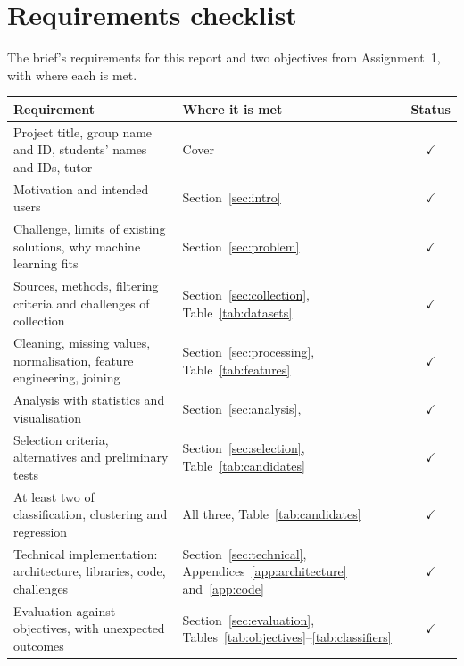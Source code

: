 \clearpage
\section{Requirements checklist}
\label{app:checklist}

The brief's requirements for this report and two objectives from Assignment~1, with where each is met.

{\footnotesize
\begin{longtable}{|L{7.4cm}|L{6.2cm}|c|}
\hline
{}\textbf{Requirement} & \textbf{Where it is met} & \textbf{Status} \\ \hline
\endhead
Project title, group name and ID, students' names and IDs, tutor & Cover & $\checkmark$ \\ \hline
Motivation and intended users & Section~\ref{sec:intro} & $\checkmark$ \\ \hline
Challenge, limits of existing solutions, why machine learning fits & Section~\ref{sec:problem} & $\checkmark$ \\ \hline
Sources, methods, filtering criteria and challenges of collection & Section~\ref{sec:collection}, Table~\ref{tab:datasets} & $\checkmark$ \\ \hline
Cleaning, missing values, normalisation, feature engineering, joining & Section~\ref{sec:processing}, Table~\ref{tab:features} & $\checkmark$ \\ \hline
Analysis with statistics and visualisation & Section~\ref{sec:analysis},  & $\checkmark$ \\ \hline
Selection criteria, alternatives and preliminary tests & Section~\ref{sec:selection}, Table~\ref{tab:candidates} & $\checkmark$ \\ \hline
At least two of classification, clustering and regression & All three, Table~\ref{tab:candidates} & $\checkmark$ \\ \hline
Technical implementation: architecture, libraries, code, challenges & Section~\ref{sec:technical}, Appendices~\ref{app:architecture} and~\ref{app:code} & $\checkmark$ \\ \hline
Evaluation against objectives, with unexpected outcomes & Section~\ref{sec:evaluation}, Tables~\ref{tab:objectives}--\ref{tab:classifiers} & $\checkmark$ \\ \hline

\end{longtable}}
